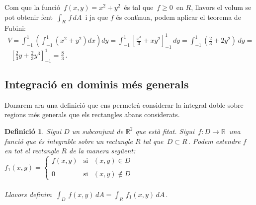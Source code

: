\documentclass[12pt]{article}
\newtheorem{definicio}{Definici{\'o}}[subsection]
\newcommand{\R}{\mathbb{R}}
\begin{document}
\vspace*{1cm}

Com que la funci{\'o} $\, f(x,y)=x^2+y^2\, $ {\'e}s tal que $\, f\geq 0\, $
en $R$, llavors el volum se pot obtenir fent $\, \displaystyle\int_R
\, f\, dA\, $ i ja que $f$ {\'e}s cont{\'\i}nua, podem aplicar el teorema de
Fubini:\\

\hspace*{1cm}$\displaystyle\ \
V=\int_{-1}^1\left(\int_{-1}^1(x^2+y^2)dx\right)dy=
\int_{-1}^1\left[\frac{x^3}{3} +x
y^2\right]_{-1}^1\,dy=\int_{-1}^1(\frac{2}{3}
+2y^2)\,dy=$\\

\hspace*{1cm}$\displaystyle\ \ \ \ \left[\frac{2}{3}y
+\frac{2}{3}y^3\right]_{-1}^1=\frac{8}{3}\,.$

\vspace*{1cm}
\subsection{Integraci{\'o} en dominis m{\'e}s generals}

Donarem ara una definici{\'o} que ens permetr{\`a} considerar la integral
doble sobre regions m{\'e}s generals que els rectangles abans
considerats.

\begin{definicio}
Sigui $D$ un subconjunt de $\R^2$ que est{\`a} fitat. Sigui
$\,f:D\to\R\,$ una funci{\'o} que {\'e}s integrable sobre un rectangle $R$
tal que $\,D\subset R\,.$ Podem estendre $f$ en tot el rectangle $R$
de la manera seg{\"u}ent:\\

\hspace*{3cm}$f_1(x,y)=\left\{\begin{array}{ll}
              f(x,y) & \mbox{si $\ \ (x,y)\in D$}\\
               & \\
               0  & \mbox{si $\ \ (x,y)\not\in D$}
             \end{array} \right .$\\\\

Llavors definim $\
\displaystyle\int_D\,f(x,y)\,dA=\int_R\,f_1(x,y)\,dA\,.$
\end{definicio}
\end{document}

